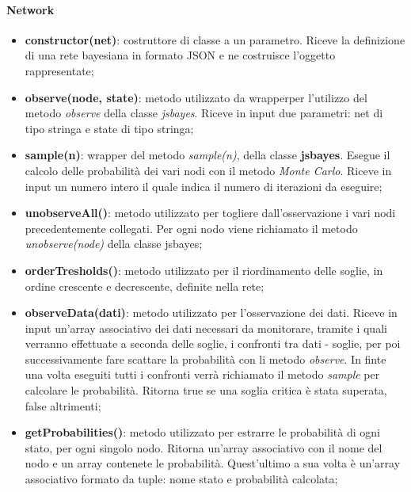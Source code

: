 \paragraph{Network}
\begin{itemize}

	\item \textbf{constructor(net)}: costruttore di classe a un parametro. Riceve la definizione di una rete 
	bayesiana in formato JSON e ne costruisce l'oggetto rappresentate; 

	\item \textbf{observe(node, state)}: metodo utilizzato da wrapper\glossario per l'utilizzo del metodo 
	\textit{observe} della classe \textit{jsbayes}. Riceve in input due parametri: net	di tipo stringa e state di 
	tipo stringa; 

	\item \textbf{sample(n)}: wrapper del metodo \textit{sample(n)}, della classe \textbf{jsbayes}. 
	Esegue il calcolo delle probabilità dei vari nodi con il metodo \textit{Monte Carlo}. Riceve in input un 
	numero intero il quale indica il numero di iterazioni da eseguire; 
	
	\item \textbf{unobserveAll()}: metodo utilizzato per togliere dall'osservazione i vari nodi precedentemente 
	collegati. Per ogni nodo viene richiamato il metodo \textit{unobserve(node)} della classe jsbayes; 
	
	\item \textbf{orderTresholds()}: metodo utilizzato per il riordinamento delle soglie, in ordine crescente e 
	decrescente, definite nella rete; 
	
	\item \textbf{observeData(dati)}: metodo utilizzato per l'osservazione dei dati. Riceve in input un'array 
	associativo dei dati necessari da monitorare, tramite i quali verranno effettuate a seconda delle 
	soglie, i confronti tra dati - soglie, per poi successivamente fare scattare la probabilità con li metodo 
	\textit{observe}. In finte una volta eseguiti tutti i confronti verrà richiamato il metodo \textit{sample} per 
	calcolare le probabilità. Ritorna true se una soglia critica è stata superata, false altrimenti; 
	
	\item \textbf{getProbabilities()}: metodo utilizzato per estrarre le probabilità di ogni stato, per ogni 
	singolo nodo. Ritorna un'array associativo con il nome del nodo e un array contenete le probabilità. 
	Quest'ultimo a sua volta è un'array associativo formato da tuple: nome stato e probabilità calcolata; 
			
\end{itemize}

